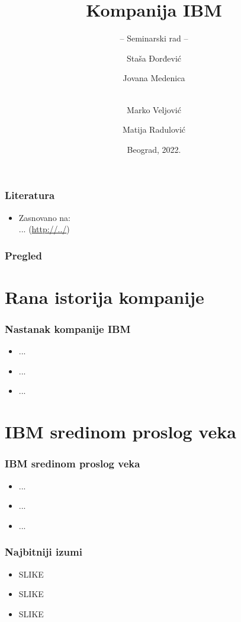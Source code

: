 \documentclass{beamer}
\title[]{Kompanija IBM}
\subtitle{-- Seminarski rad --}
\author[]{Staša Đorđević \and
Jovana Medenica \and  \\
Marko Veljović \and
Matija Radulović}
\institute[]{Matematički fakultet\\Univerzitet u Beogradu}
\date{
    \footnotesize{Beograd, 2022.}	
}
\begin{document}
\begin{frame}
	\thispagestyle{empty}
	\titlepage
\end{frame}

\begin{frame}[fragile]\frametitle{Literatura}
	\begin{itemize}
		\item Zasnovano na:\\
		...
		(\url{http://../})
	\end{itemize}
\end{frame}

\begin{frame}
	\frametitle{Pregled} %
	\tableofcontents[hidesubsections] 
\end{frame}

\section{Rana istorija kompanije}

\begin{frame}[fragile]\frametitle{Nastanak kompanije IBM}
	\begin{itemize}	
		\item ...
		\item ...
		\item ...
		\end{itemize}
\end{frame}

\section{IBM sredinom proslog veka}

\begin{frame}[fragile]\frametitle{IBM sredinom proslog veka}
	\begin{itemize}	
		\item ...
		\item ...
		\item ...
	\end{itemize}
\end{frame}

\begin{frame}[fragile]\frametitle{Najbitniji izumi}
	\begin{itemize}	
		\item SLIKE
		\item SLIKE
		\item SLIKE
	\end{itemize}
\end{frame}
\end{document}
